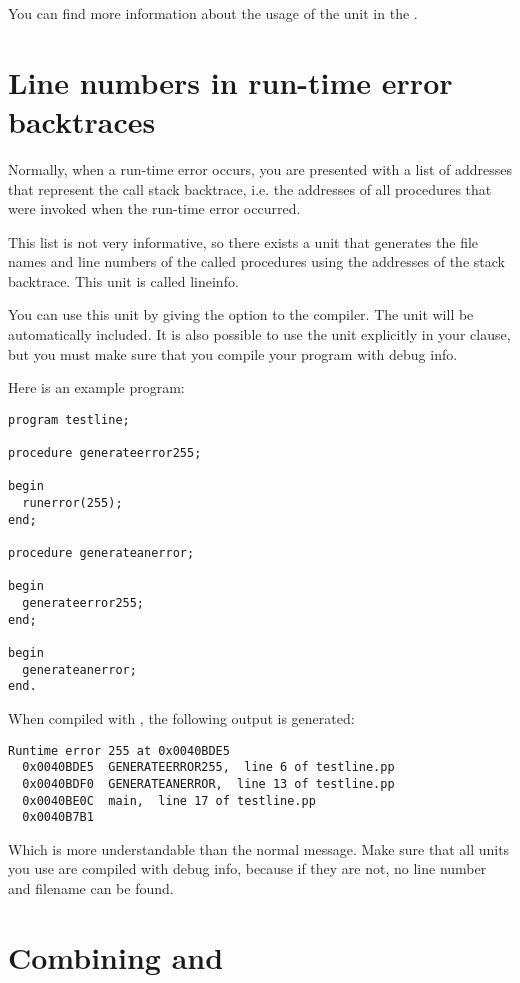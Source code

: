 \documentclass{book}
\begin{document}
You can find more information about the usage of the  unit
in the \unitsref.

\section{Line numbers in run-time error backtraces}
\label{se:lineinfo}

Normally, when a run-time error occurs, you are presented with a list
of addresses that represent the call stack backtrace, i.e. the addresses
of all procedures that were invoked when the run-time error occurred.

This list is not very informative, so there exists a unit that generates
the file names and line numbers of the called procedures using the
addresses of the stack backtrace. This unit is called lineinfo.

You can use this unit by giving the  option to the compiler. The
unit will be automatically included. It is also possible to use the unit
explicitly in your  clause, but you must make sure that you
compile your program with debug info.

Here is an example program:
\begin{verbatim}
program testline;

procedure generateerror255;

begin
  runerror(255);
end;

procedure generateanerror;

begin
  generateerror255;
end;

begin
  generateanerror;
end.
\end{verbatim}
When compiled with , the following output is generated:
\begin{verbatim}
Runtime error 255 at 0x0040BDE5
  0x0040BDE5  GENERATEERROR255,  line 6 of testline.pp
  0x0040BDF0  GENERATEANERROR,  line 13 of testline.pp
  0x0040BE0C  main,  line 17 of testline.pp
  0x0040B7B1
\end{verbatim}
Which is more understandable than the normal message. Make sure that all
units you use are compiled with debug info, because if they are not, no
line number and filename can be found.

\section{Combining  and }
\end{document}
